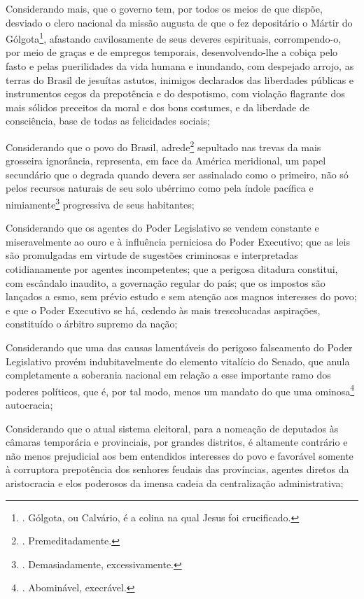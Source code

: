Considerando mais, que o governo tem, por todos os meios de que dispõe,
desviado o clero nacional da missão augusta de que o fez depositário o
Mártir do Gólgota\footnote{. Gólgota, ou Calvário, é a colina na qual
  Jesus foi crucificado.}, afastando cavilosamente de seus deveres
espirituais, corrompendo-o, por meio de graças e de empregos temporais,
desenvolvendo-lhe a cobiça pelo fasto e pelas puerilidades da vida
humana e inundando, com despejado arrojo, as terras do Brasil de
jesuítas astutos, inimigos declarados das liberdades públicas e
instrumentos cegos da prepotência e do despotismo, com violação
flagrante dos mais sólidos preceitos da moral e dos bons costumes, e da
liberdade de consciência, base de todas as felicidades sociais;

Considerando que o povo do Brasil, adrede\footnote{. Premeditadamente.}
sepultado nas trevas da mais grosseira ignorância, representa, em face
da América meridional, um papel secundário que o degrada quando devera
ser assinalado como o primeiro, não só pelos recursos naturais de seu
solo ubérrimo como pela índole pacífica e nimiamente\footnote{.
  Demasiadamente, excessivamente.} progressiva de seus habitantes;

Considerando que os agentes do Poder Legislativo se vendem constante e
miseravelmente ao ouro e à influência perniciosa do Poder Executivo; que
as leis são promulgadas em virtude de sugestões criminosas e
interpretadas cotidianamente por agentes incompetentes; que a perigosa
ditadura constitui, com escândalo inaudito, a governação regular do
país; que os impostos são lançados a esmo, sem prévio estudo e sem
atenção aos magnos interesses do povo; e que o Poder Executivo se há,
cedendo às mais trescolucadas aspirações, constituído o árbitro supremo
da nação;

Considerando que uma das causas lamentáveis do perigoso falseamento do
Poder Legislativo provém indubitavelmente do elemento vitalício do
Senado, que anula completamente a soberania nacional em relação a esse
importante ramo dos poderes políticos, que é, por tal modo, menos um
mandato do que uma ominosa\footnote{. Abominável, execrável.}
autocracia;

Considerando que o atual sistema eleitoral, para a nomeação de deputados
às câmaras temporária e provinciais, por grandes distritos, é altamente
contrário e não menos prejudicial aos bem entendidos interesses do povo
e favorável somente à corruptora prepotência dos senhores feudais das
províncias, agentes diretos da aristocracia e elos poderosos da imensa
cadeia da centralização administrativa;

